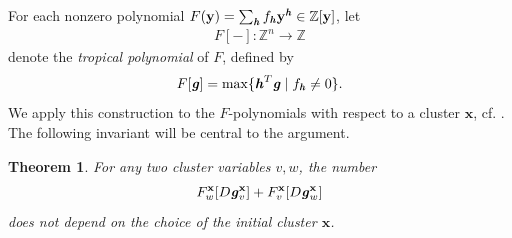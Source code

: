 \documentclass[11pt,reqno]{amsart}
\providecommand{\xlongrightarrow}[2][]{\xrightarrow[#1]{#2}}
\theoremstyle{plain}
\newtheorem{theorem}{Theorem}[section]
\theoremstyle{definition}
\numberwithin{equation}{section}
\newcommand\ZZ{\mathbb{Z}}
\newcommand\<{\langle}
\renewcommand\>{\rangle}
\renewcommand{\setminus}{\smallsetminus}
\newcommand{\on}[1]{\operatorname{#1}}
\def\CCx{\on{Cpx}}   %
\def\vv{\mathbf{v}}
\def\sink{X}
\newcommand{\flowD}[1]{\on{Evo}_{\downarrow}^{#1}}
\newcommand{\flowU}[1]{\on{Evo}_{\uparrow}^{#1}}
\newcommand{\flowDU}[1]{\on{Evo}_{\updownarrow}^{#1}}
\newcommand{\ccpt}[1]{\mathrm{#1}}%
\def\xevo{\ccpt{X}}%
\newcommand{\bfit}[1]{\textbf{\textit{#1}}}
\def\seeds{\mathbf{\Sigma}}
\def\xx{\mathbf{x}}%
\def\yy{\mathbf{y}}%
\def\gvec{\bfit{g}}
\def\Fpoly{{F}}
\newcommand{\ol}[1]{\overline{#1}}
\newcommand{\DT}[1]{#1^{\vee}}
\def\Xevo{\DT{\ccpt{X}}}
\def\ZZp{\ZZ_{\ge0}}
\begin{document}

For each nonzero polynomial $F(\yy)=\sum_{\bfit{h}}f_{\bfit{h}}\yy^{\bfit{h}}\in\ZZ[\yy]$, let
\begin{gather}\label{eq:tropoly}
    F[-]:\ZZ^n\to\ZZ
\end{gather}
denote the \emph{tropical polynomial} of $F$, defined by
\[
F[\gvec]=\max\{\bfit{h}^T\gvec\mid f_{\bfit{h}}\ne0\}.
\]
We apply this construction to the $F$-polynomials with respect to a cluster ${\xx}$, cf. .
The following invariant will be central to the argument.

\begin{theorem}\cite[Thm.~4.10]{Cao}\label{prop:tropoly}
For any two cluster variables $v,w$, the number
\[
    \Fpoly^{{\xx}}_w[D\gvec^{{\xx}}_{v}]+\Fpoly^{{\xx}}_v[D\gvec^{{\xx}}_{w}]
\]
does not depend on the choice of the initial cluster ${\xx}$.
\end{theorem}
\end{document}
